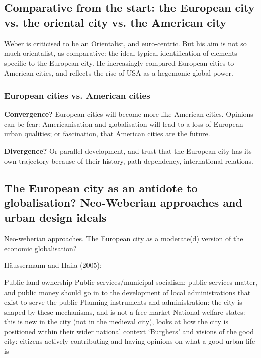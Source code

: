 \documentclass{article}
\begin{document}
\subsection{Comparative from the start: the European city vs. the oriental city vs. the American city}

Weber is criticised to be an Orientalist, and euro-centric.
But his aim is not so much orientalist, as comparative: the ideal-typical identification of elements specific to the European city.
He increasingly compared European cities to American cities, and reflects the rise of USA as a hegemonic global power. 

\subsubsection{European cities vs. American cities}

\textbf{Convergence?} European cities will become more like American cities. Opinions can be fear: Americanisation and globalisation will lead to a loss of European urban qualities; or fascination, that American cities are the future.

\textbf{Divergence?} Or parallel development, and trust that the European city has its own trajectory because of their history, path dependency, international relations.

\subsection{The European city as an antidote to globalisation? Neo-Weberian approaches and urban design ideals}

Neo-weberian approaches. The European city as a moderate(d) version of the economic globalisation?

Häussermann and Haila (2005):
\begin{outline}
	\1 Public land ownership
	\1 Public services/municipal socialism: public services matter, and public money should go in to the development of local administrations that exist to serve the public
	\1 Planning instruments and administration: the city is shaped by these mechanisms, and is not a free market
	\1 National welfare states: this is new in the city (not in the medieval city), looks at how the city is positioned within their wider national context
	\1 `Burghers' and visions of the good city: citizens actively contributing and having opinions on what a good urban life is
\end{outline}
\end{document}
